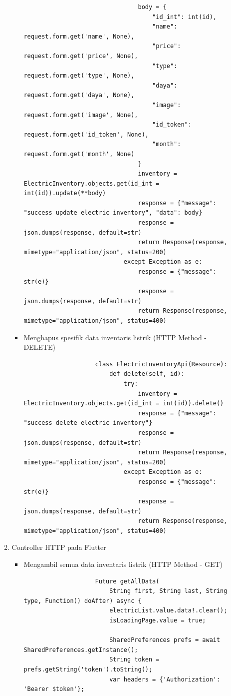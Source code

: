 \begin{spacing}{1.5}
\begin{enumerate}
\begin{enumerate}
\begin{itemize}
\begin{lstlisting}
								body = {
									"id_int": int(id),
									"name": request.form.get('name', None),
									"price": request.form.get('price', None),
									"type": request.form.get('type', None),
									"daya": request.form.get('daya', None),
									"image": request.form.get('image', None),
									"id_token": request.form.get('id_token', None),
									"month": request.form.get('month', None)
								}
								inventory = ElectricInventory.objects.get(id_int = int(id)).update(**body)
								response = {"message": "success update electric inventory", "data": body}
								response = json.dumps(response, default=str)
								return Response(response, mimetype="application/json", status=200)
							except Exception as e:
								response = {"message": str(e)}
								response = json.dumps(response, default=str)
								return Response(response, mimetype="application/json", status=400)
				\end{lstlisting}

				\item Menghapus spesifik data inventaris listrik (HTTP Method - DELETE)
				
				\begin{lstlisting}
					class ElectricInventoryApi(Resource):
						def delete(self, id):
							try:
								inventory = ElectricInventory.objects.get(id_int = int(id)).delete()
								response = {"message": "success delete electric inventory"}
								response = json.dumps(response, default=str)
								return Response(response, mimetype="application/json", status=200)
							except Exception as e:
								response = {"message": str(e)}
								response = json.dumps(response, default=str)
								return Response(response, mimetype="application/json", status=400)
				\end{lstlisting}
			\end{itemize}

			\item Controller HTTP pada Flutter
			
			\begin{itemize}
				\item Mengambil semua data inventaris listrik (HTTP Method - GET)
				
				\begin{lstlisting}
					Future getAllData(
						String first, String last, String type, Function() doAfter) async {
						electricList.value.data!.clear();
						isLoadingPage.value = true;

						SharedPreferences prefs = await SharedPreferences.getInstance();
						String token = prefs.getString('token').toString();
						var headers = {'Authorization': 'Bearer $token'};


\end{lstlisting}
\end{itemize}
\end{enumerate}
\end{enumerate}
\end{spacing}

